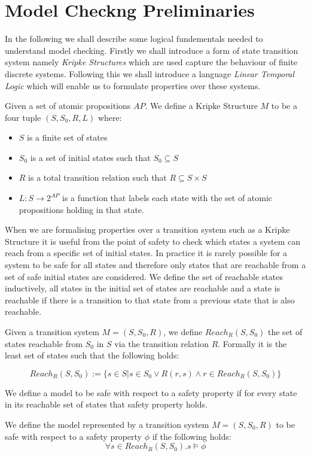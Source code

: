 \section{Model Checkng Preliminaries}
In the following we shall describe some logical fundementals needed to understand model checking. Firstly we shall introduce a form of state transition system namely \emph{Kripke Structures} which are used capture the behaviour of finite discrete systems. Following this we shall introduce a language \emph{Linear Temporal Logic} which will enable us to formulate properties over these systems.
\medskip
\begin{mydef}
Given a set of atomic propositions $AP$. We define a Kripke Structure $M$ to be a four tuple $(S, S_0, R, L)$
where:
\begin{itemize} 
\item $S$ is a finite set of states
\item $S_0$ is a set of initial states such that $S_0 \subseteq S$
\item $R$ is a total transition relation such that $R \subseteq S \times S$
\item $L: S \to 2^{AP}$ is a function that labels each state with the set of atomic propositions holding in that state.
\end{itemize}
\end{mydef}
\medskip
When we are formalising properties over a transition system such as a Kripke Structure it is useful from the point of safety to check which states a system can reach from a specific set of initial states. In practice it is rarely possible for a system to be safe for all states and therefore only states that are reachable from a set of safe initial states are considered. We define the set of reachable states inductively, all states in the initial set of states are reachable and a state is reachable if there is a transition to that state from a previous state that is also reachable.
\medskip
\begin{mydef}[Reachability]
Given a transition system $M = (S,S_0, R)$, we define $Reach_R(S, S_0)$ the set of states reachable from $S_0$ in $S$ via the transition relation $R$. Formally it is the least set of states such that the following holds: 

$$ Reach_R(S,S_0) := \{s \in S | s \in S_0 \vee R(r,s) \wedge r \in Reach_R(S,S_0)\} $$

\end{mydef}
\medskip
We define a model to be safe with respect to a safety property if for every state in its reachable set of states that safety property holds.
\medskip
\begin{mydef}
We define the model represented by a transition system $M = (S,S_0, R)$ to be safe with respect to a safety property $\phi$ if the following holds:
$$\forall s \in Reach_R(S,S_0). s \models \phi $$

\end{mydef}
\medskip
\newcommand{\sseq}[2]{s_{{[}#1 \ldots #2 {]}} }

